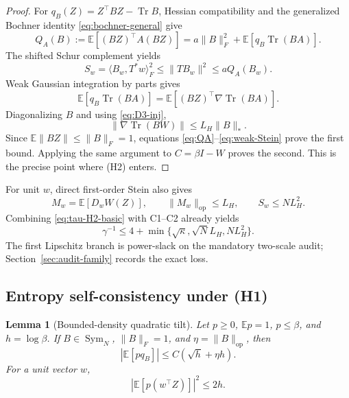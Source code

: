 \documentclass[11pt]{article}
\numberwithin{equation}{section}
\newtheorem{lemma}[theorem]{Lemma}
\DeclareMathOperator{\Tr}{Tr}
\DeclareMathOperator{\Sym}{Sym}
\newcommand{\E}{\mathbb E}
\newcommand{\op}{\mathrm{op}}
\begin{document}
\begin{proof}
For $q_B(Z)=Z^\top BZ-\Tr B$, Hessian compatibility and the generalized
Bochner identity \eqref{eq:bochner-general} give
\begin{equation}\label{eq:QA}
 Q_A(B):=\E[(BZ)^\top A(BZ)]
 =a\|B\|_F^2+\E[q_B\Tr(BA)].
\end{equation}
The shifted Schur complement yields
\[
 S_w=\langle B_w,T^*w\rangle_F^2
 \le\|TB_w\|^2\le aQ_A(B_w).
\]
Weak Gaussian integration by parts gives
\begin{equation}\label{eq:weak-Stein}
 \E[q_B\Tr(BA)]
 =\E[(BZ)^\top\nabla\Tr(BA)].
\end{equation}
Diagonalizing $B$ and using \eqref{eq:D3-inj},
\[
 \|\nabla\Tr(BW)\|\le L_H\|B\|_*.
\]
Since $\E\|BZ\|\le\|B\|_F=1$, equations
\eqref{eq:QA}--\eqref{eq:weak-Stein} prove the first bound.  Applying the
same argument to $C=\beta I-W$ proves the second.  This is the precise point
where (H2) enters.
\end{proof}

For unit $w$, direct first-order Stein also gives
\begin{equation}\label{eq:direct-Stein}
 M_w=\E[D_wW(Z)],\qquad
 \|M_w\|_{\op}\le L_H,\qquad
 S_w\le NL_H^2.
\end{equation}
Combining \eqref{eq:tau-H2-basic} with C1--C2 already yields
\begin{equation}\label{eq:H2-simple-gap}
 \gamma^{-1}\le4+\min\{\sqrt\kappa,\sqrt N L_H,NL_H^2\}.
\end{equation}
The first Lipschitz branch is power-slack on the mandatory two-scale audit;
Section~\ref{sec:audit-family} records the exact loss.

\subsection{Entropy self-consistency under (H1)}

\begin{lemma}[Bounded-density quadratic tilt]\label{lem:quadratic-entropy}
Let $p\ge0$, $\E p=1$, $p\le\beta$, and $h=\log\beta$.  If
$B\in\Sym_N$, $\|B\|_F=1$, and $\eta=\|B\|_{\op}$, then
\begin{equation}\label{eq:quadratic-tilt}
 |\E[pq_B]|\le C(\sqrt h+\eta h).
\end{equation}
For a unit vector $w$,
\begin{equation}\label{eq:linear-tilt}
 |\E[p(w^\top Z)]|^2\le2h.
\end{equation}
\end{lemma}
\end{document}
